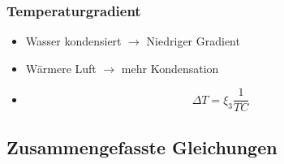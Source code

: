 \documentclass[english, aspectratio=169]{beamer}
\begin{document}
\begin{frame}
	\frametitle{Temperaturgradient}
	\begin{itemize}
	
		\item[]Wasser kondensiert  $\rightarrow$ Niedriger Gradient
		
		\item[]Wärmere Luft $\rightarrow$ mehr Kondensation
	
	
		\item[]
		\begin{equation}
			\Delta T = \xi_3 \frac{1}{TC}
		\end{equation}
	
	
		
	\end{itemize}
\end{frame}

\subsection{Zusammengefasste Gleichungen}
\end{document}
